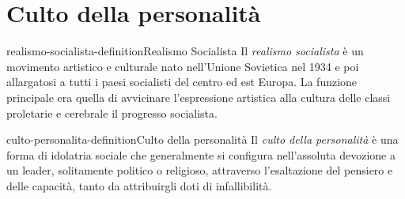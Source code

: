 \documentclass[preview]{standalone}
\begin{document}
\genpage

\section{Culto della personalità}

\begin{snippetdefinition}{realismo-socialista-definition}{Realismo Socialista}
    Il \textit{realismo socialista} è un movimento artistico e culturale nato nell'Unione Sovietica nel 1934 e poi allargatosi a tutti i paesi socialisti del centro ed est Europa. La funzione principale era quella di avvicinare l'espressione artistica alla cultura delle classi proletarie e cerebrale il progresso socialista.
\end{snippetdefinition}

\begin{snippetdefinition}{culto-personalita-definition}{Culto della personalità}
    Il \textit{culto della personalità} è una forma di idolatria sociale che
    generalmente si configura nell'assoluta devozione a un leader,
    solitamente politico o religioso, attraverso l'esaltazione del pensiero e 
    delle capacità, tanto da attribuirgli doti di infallibilità.
\end{snippetdefinition}
\end{document}
